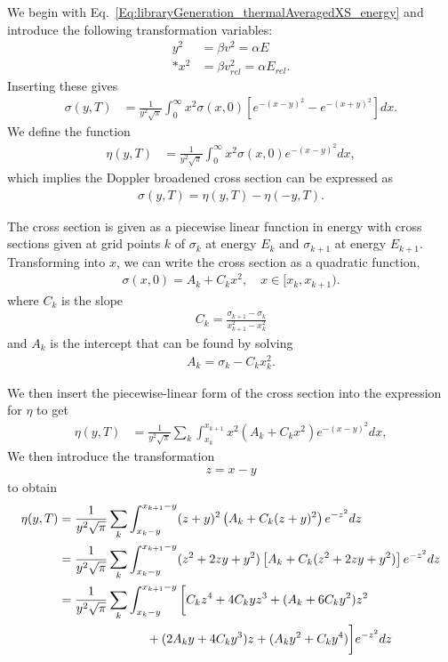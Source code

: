 We begin with Eq.~\eqref{Eq:libraryGeneration_thermalAveragedXS_energy} and introduce the following transformation variables:
\begin{subequations}
\begin{align}
  y^2 &= \beta v^2 = \alpha E \\*
  x^2 &= \beta v_{rel}^2 = \alpha E_{rel} .
\end{align}
\end{subequations}
Inserting these gives
\begin{align}
  \sigma(y,T) &= \frac{1}{y^2 \sqrt{\pi}} \int_0^\infty x^2 \sigma(x,0) \left[ e^{-(x-y)^2} - e^{-(x+y)^2} \right] dx.
\end{align}
We define the function
\begin{align}
  \eta(y,T) &= \frac{1}{y^2 \sqrt{\pi}} \int_0^\infty x^2 \sigma(x,0) e^{-(x-y)^2} dx,
\end{align}
which implies the Doppler broadened cross section can be expressed as
\begin{align}
  \sigma(y,T) = \eta(y,T) - \eta(-y,T) .
\end{align}

The cross section is given as a piecewise linear function in energy with cross sections given at grid points $k$ of $\sigma_k$ at energy $E_k$ and $\sigma_{k+1}$ at energy $E_{k+1}$. Transforming into $x$, we can write the cross section as a quadratic function,
\begin{align}
  \sigma(x,0) = A_k + C_k x^2, \quad x \in [x_k,x_{k+1}) .
\end{align}
where $C_k$ is the slope
\begin{align}
  C_k = \frac{ \sigma_{k+1} - \sigma_k }{ x_{k+1}^2 - x_k^2 } \nonumber
\end{align}
and $A_k$ is the intercept that can be found by solving
\begin{align}
  A_k = \sigma_k - C_k x_k^2 . \nonumber
\end{align}

We then insert the piecewise-linear form of the cross section into the expression for $\eta$ to get
\begin{align}
  \eta(y,T) &= \frac{1}{y^2 \sqrt{\pi}} \sum_k \int_{x_k}^{x_{k+1}} x^2 \left( A_k + C_k x^2 \right) e^{-(x-y)^2} dx ,
\end{align}
We then introduce the transformation
\begin{align}
  z = x-y \nonumber
\end{align}
to obtain
\begin{align}
  \eta(y,T) 
  &= \frac{1}{y^2 \sqrt{\pi}} \sum_k \int_{x_k-y}^{x_{k+1}-y} (z+y)^2 \left( A_k + C_k (z+y)^2 \right) e^{-z^2} dz \nonumber \\
  &= \frac{1}{y^2 \sqrt{\pi}} \sum_k \int_{x_k-y}^{x_{k+1}-y} ( z^2 + 2zy + y^2 ) \left[ A_k + C_k ( z^2 + 2zy + y^2 ) \right] e^{-z^2} dz \nonumber \\
  &= \frac{1}{y^2 \sqrt{\pi}} \sum_k \int_{x_k-y}^{x_{k+1}-y} \bigg[ C_k z^4 + 4 C_k y z^3 + ( A_k + 6 C_k y^2 ) z^2  \nonumber \\
  &\hspace{2.5cm}  + ( 2 A_k y + 4 C_k y^3 ) z + ( A_k y^2 + C_k y^4 )  \bigg] e^{-z^2} dz
\end{align}

